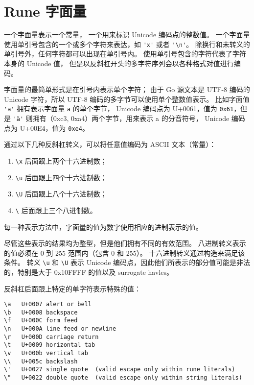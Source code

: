 \section{Rune 字面量}\label{sec:rune}
一个\rune{}字面量表示一个\rune{}常量，
一个用来标识 Unicode 编码点的整数值。
一个\rune{}字面量使用单引号包含的一个或多个字符来表达，如 \lstinline|'x'| 或者 \lstinline|'\n'|。
除换行和未转义的单引号外，任何字符都可以出现在单引号内。
使用单引号包含的字符代表了字符本身的 Unicode 值，
但是以反斜杠开头的多字符序列会以各种格式对值进行编码。

\rune{}字面量的最简单形式是在引号内表示单个字符；
由于 Go 源文本是 UTF-8 编码的 Unicode 字符，所以 UTF-8 编码的多字节可以使用单个整数值表示。
比如字面值 \lstinline|'a'| 拥有表示字面量 \lstinline|a| 的单个字节，
Unicode 编码点为 U+0061，值为 \lstinline|0x61|，但是 \lstinline|'ä'| 则拥有（0xc3, 0xa4）两个字节，用来表示 a 的分音符号，
Unicode 编码点为 U+00E4，值为 \lstinline|0xe4|。

通过以下几种反斜杠转义，可以将任意值编码为 ASCII 文本（\rune 常量）：
\begin{enumerate}
\item \lstinline|\x| 后面跟上两个十六进制数；
\item \lstinline|\u| 后面跟上四个十六进制数；
\item \lstinline|\U| 后面跟上八个十六进制数；
\item \lstinline|\|  后面跟上三个八进制数。
\end{enumerate}
每一种表示方法中，字面量的值为数字使用相应的进制表示的值。

尽管这些表示的结果均为整型，但是他们拥有不同的有效范围。
八进制转义表示的值必须在 0 到 255 范围内（包含 0 和 255）。
十六进制转义通过构造来满足该条件。%
转义 \lstinline|\u| 和 \lstinline|\U| 表示 Unicode 编码点，因此他们所表示的部分值可能是非法的，特别是大于 0x10FFFF 的值以及 surrogate havles。

反斜杠后面跟上特定的单字符表示特殊的值：
\begin{lstlisting}
\a   U+0007 alert or bell
\b   U+0008 backspace
\f   U+000C form feed
\n   U+000A line feed or newline
\r   U+000D carriage return
\t   U+0009 horizontal tab
\v   U+000b vertical tab
\\   U+005c backslash
\'   U+0027 single quote  (valid escape only within rune literals)
\"   U+0022 double quote  (valid escape only within string literals)
\end{lstlisting}

